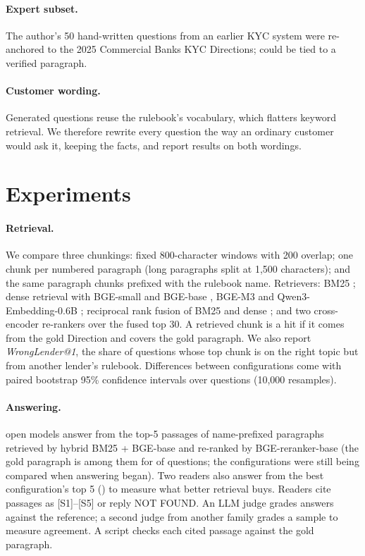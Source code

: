 \documentclass[11pt]{article}
\begin{document}
\paragraph{Expert subset.} The author's 50 hand-written questions from an earlier KYC system \citep{kycrag} were re-anchored to the 2025 Commercial Banks KYC Directions; \NExpertAnchored{} could be tied to a verified paragraph.

\paragraph{Customer wording.} Generated questions reuse the rulebook's vocabulary, which flatters keyword retrieval. We therefore rewrite every question the way an ordinary customer would ask it, keeping the facts, and report results on both wordings.

\section{Experiments}

\paragraph{Retrieval.} We compare three chunkings: fixed 800-character windows with 200 overlap; one chunk per numbered paragraph (long paragraphs split at 1,500 characters); and the same paragraph chunks prefixed with the rulebook name. Retrievers: BM25 \citep{robertson2009bm25}; dense retrieval with BGE-small and BGE-base \citep{xiao2023cpack}, BGE-M3 \citep{chen2024m3} and Qwen3-Embedding-0.6B \citep{zhang2025qwen3emb}; reciprocal rank fusion of BM25 and dense \citep{cormack2009rrf}; and two cross-encoder re-rankers over the fused top 30. A retrieved chunk is a hit if it comes from the gold Direction and covers the gold paragraph. We also report \emph{WrongLender@1}, the share of questions whose top chunk is on the right topic but from another lender's rulebook. Differences between configurations come with paired bootstrap 95\% confidence intervals over questions (10,000 resamples).

\paragraph{Answering.} \NReaders{} open models answer from the top-5 passages of name-prefixed paragraphs retrieved by hybrid BM25 + BGE-base and re-ranked by BGE-reranker-base (the gold paragraph is among them for \CtxRfive{} of questions; the configurations were still being compared when answering began). Two readers also answer from the best configuration's top 5 (\CtxBestRfive{}) to measure what better retrieval buys. Readers cite passages as [S1]--[S5] or reply NOT FOUND. An LLM judge grades answers against the reference; a second judge from another family grades a sample to measure agreement. A script checks each cited passage against the gold paragraph.
\end{document}
